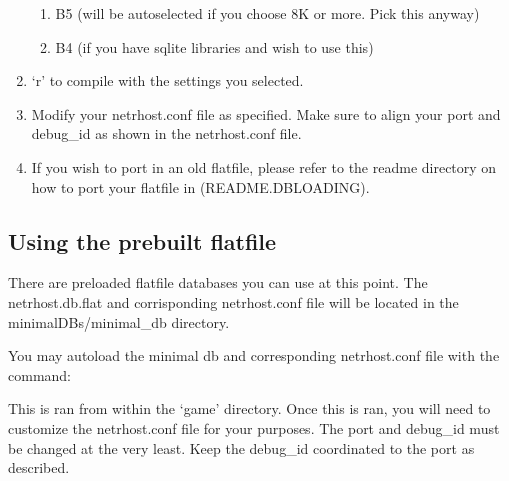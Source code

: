 \documentclass[letterpaper,10pt,english]{sphinxmanual}
\begin{document}
\begin{enumerate}
\begin{enumerate}
\item {} 
\sphinxAtStartPar
B5 (will be autoselected if you choose 8K or more.  Pick this anyway)

\item {} 
\sphinxAtStartPar
B4 (if you have sqlite libraries and wish to use this)

\end{enumerate}

\item {} 
\sphinxAtStartPar
‘r’ to compile with the settings you selected.

\item {} 
\sphinxAtStartPar
Modify your netrhost.conf file as specified.  Make sure to align your port and debug\_id as shown in the netrhost.conf file.

\item {} 
\sphinxAtStartPar
If you wish to port in an old flatfile, please refer to the readme directory on how to port your flatfile in (README.DBLOADING).

\end{enumerate}


\subsection{Using the prebuilt flatfile}
\label{\detokenize{install:using-the-prebuilt-flatfile}}
\sphinxAtStartPar
There are pre\sphinxhyphen{}loaded flatfile databases you can use at this point.  The netrhost.db.flat
and corrisponding netrhost.conf file will be located in the minimal\sphinxhyphen{}DBs/minimal\_db directory.

\sphinxAtStartPar
You may auto\sphinxhyphen{}load the minimal db and corresponding netrhost.conf file with the command:

\begin{sphinxVerbatim}[commandchars=\\\{\}]
\end{sphinxVerbatim}

\sphinxAtStartPar
This is ran from within the ‘game’ directory.  Once this is ran, you will need
to customize the netrhost.conf file for your purposes.  The port and debug\_id must
be changed at the very least.  Keep the debug\_id coordinated to the port as described.
\end{document}
